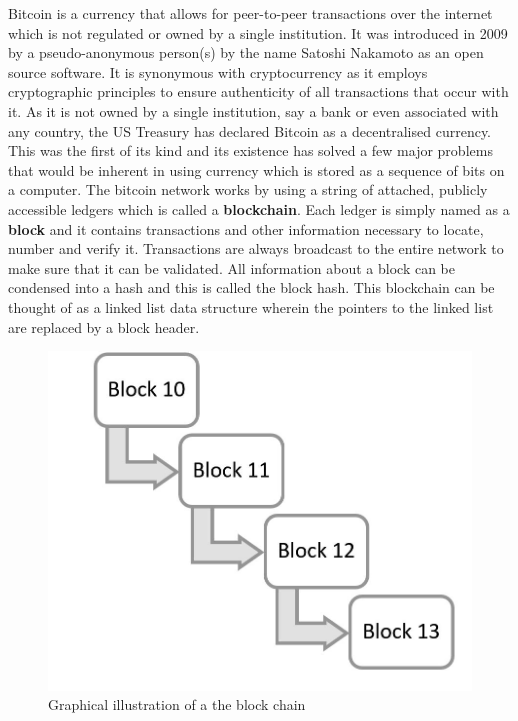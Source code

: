 \documentclass[12pt,a4paper]{report}
\begin{document}
\begin{justify}
Bitcoin is a currency that allows for peer-to-peer transactions over the internet which is not regulated or owned by a single institution. It was introduced in 2009 by a pseudo-anonymous person(s) by the name Satoshi Nakamoto as an open source software.
\vspace{10mm}
\justify
It is synonymous with cryptocurrency as it employs cryptographic principles to ensure authenticity of all transactions that occur with it. As it is not owned by a single institution, say a bank or even associated with any country, the US Treasury has declared Bitcoin as a decentralised currency. This was the first of its kind and its existence has solved a few major problems that would be inherent in using currency which is stored as a sequence of bits on a computer.
The bitcoin network works by using a string of attached, publicly accessible ledgers which is called a \textbf{blockchain}. Each ledger is simply named as a \textbf{block} and it contains transactions and other information necessary to locate, number and verify it. Transactions are always broadcast to the entire network to make sure that it can be validated. All information about a block can be condensed into a hash and this is called the block hash. This blockchain can be thought of as a linked list data structure wherein the pointers to the linked list are replaced by a block header.

\begin{figure}[h]
\centering
\caption{Graphical illustration of a the block chain}
\includegraphics[scale=0.4]{pics/Block.JPG}


\end{figure}
\end{justify}
\end{document}
